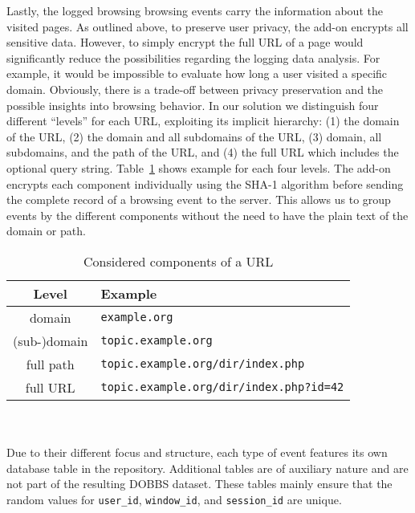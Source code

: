 \documentclass[11pt,fleqn,twoside]{article}
\begin{document}
Lastly, the logged browsing browsing events carry the information about the visited pages. As outlined above, to preserve user privacy, the add-on encrypts all sensitive data. However, to simply encrypt the full URL of a page would significantly reduce the possibilities regarding the logging data analysis. For example, it would be impossible to evaluate how long a user visited a specific domain. Obviously, there is a trade-off between privacy preservation and the possible insights into browsing behavior. In our solution we distinguish four different ``levels'' for each URL, exploiting its implicit hierarchy: (1) the domain of the URL, (2) the domain and all subdomains of the URL, (3) domain, all subdomains, and the path of the URL, and (4) the full URL which includes the optional query string. Table~\ref{tab:url_components} shows example for each four levels. The add-on encrypts each component individually using the SHA-1 algorithm before sending the complete record of a browsing event to the server. This 
allows us to group events by the different components without the need to have the plain text of the domain or path.
\begin{table}
\small
\begin{center}
\begin{tabular}{|c|p{8cm}|}
  \hline
  \textbf{Level} & \textbf{Example} \\
  \hline\hline
  domain   & \texttt{example.org} \\
  \hline
  (sub-)domain   &\texttt{topic.example.org} \\
  \hline
  full path   &\texttt{topic.example.org/dir/index.php} \\
  \hline
  full URL   &\texttt{topic.example.org/dir/index.php?id=42} \\
  \hline
\end{tabular} 
\end{center}
\caption{Considered components of a URL} 
\label{tab:url_components}
\end{table}
\\
\\
Due to their different focus and structure, each type of event features its own database table in the repository. Additional tables are of auxiliary nature and are not part of the resulting DOBBS dataset. These tables mainly ensure that the random values for \texttt{user\_id}, \texttt{window\_id}, and \texttt{session\_id} are unique.
\end{document}
